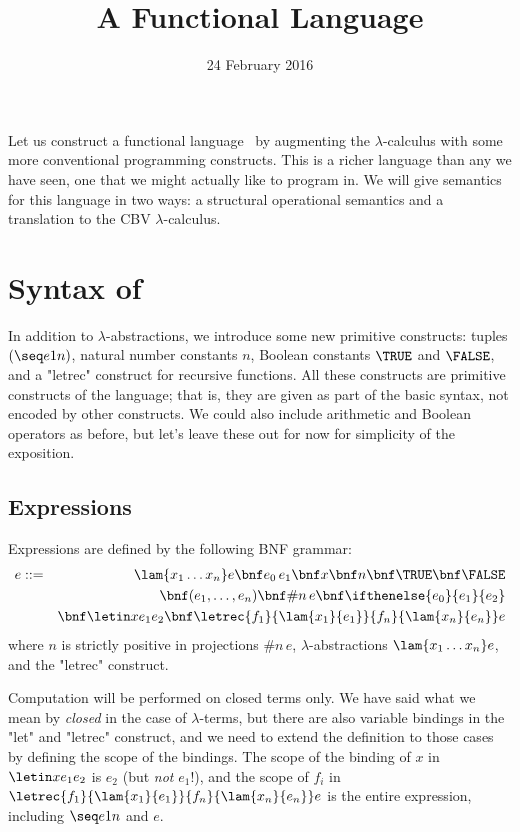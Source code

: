 \title{A Functional Language}
\date{24 February 2016}
\maketitle

Let us construct a functional language \FL\ by augmenting the $\lambda$-calculus with some more conventional programming constructs. This is a richer language than any we have seen, one that we might actually like to program in. We will give semantics for this language in two ways: a structural operational semantics and a
translation to the CBV $\lambda$-calculus. 

\section{Syntax of \FL}

In addition to $\lambda$-abstractions, we introduce some new primitive constructs: tuples $(\seq e1n)$, natural number constants $n$, Boolean constants $\TRUE$ and $\FALSE$, and a "letrec" construct for recursive functions. All these constructs are primitive constructs of the language; that is, they are given as part of the basic syntax, not encoded by other constructs. We could also include arithmetic and Boolean operators as before, but let's leave these out for now for simplicity of the exposition.

\subsection{Expressions}
Expressions are defined by the following BNF grammar:
\begin{eqnarray*}
e &::=& \lam{x_1\ldots x_n}e \bnf e_0\,e_1 \bnf x \bnf n \bnf \TRUE \bnf \FALSE\\
&& \bnf (e_1,\ldots,e_n) \bnf \#n\,e \bnf \ifthenelse{e_0}{e_1}{e_2}\\
&& \bnf \letin x{e_1}{e_2} \bnf \letrec{f_1}{\lam{x_1}{e_1}}{f_n}{\lam{x_n}{e_n}}e 
\end{eqnarray*}
where $n$ is strictly positive in projections $\#n\,e$, $\lambda$-abstractions $\lam{x_1\ldots x_n}e$, and the "letrec" construct.

Computation will be performed on closed terms only. We have said what we mean by \emph{closed} in the case of $\lambda$-terms, but there are also variable bindings in the "let" and "letrec" construct, and we need to extend the definition to those cases by defining the scope of the bindings. The scope of the binding of $x$ in $\letin x{e_1}{e_2}$ is $e_2$ (but \emph{not} $e_1$!), and the scope of $f_i$ in $\letrec{f_1}{\lam{x_1}{e_1}}{f_n}{\lam{x_n}{e_n}}e$ is the entire expression, including $\seq e1n$ and $e$.

